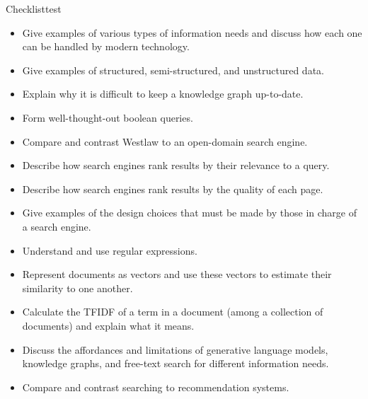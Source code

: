 \begin{tblsfilledsymbol}{Checklist}{test}
    
\begin{itemize}
\item Give examples of various types of information needs and discuss how each one can be handled by modern technology.
\item Give examples of structured, semi-structured, and unstructured data.
\item Explain why it is difficult to keep a knowledge graph up-to-date.
\item Form well-thought-out boolean queries.
\item Compare and contrast Westlaw to an open-domain search engine.
\item Describe how search engines rank results by their relevance to a query.
\item Describe how search engines rank results by the quality of each page. 
\item Give examples of the design choices that must be made by those in charge of a search engine.
\item Understand and use regular expressions.
\item Represent documents as vectors and use these vectors to estimate their similarity to one another.
\item Calculate the TFIDF of a term in a document (among a collection of documents) and explain what it means.
\item Discuss the affordances and limitations of generative language models, knowledge graphs, and free-text search for different information needs.
\item Compare and contrast searching to recommendation systems.
\end{itemize}
\end{tblsfilledsymbol}


